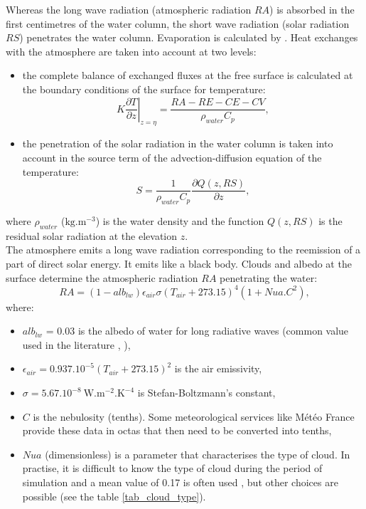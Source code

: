 Whereas the long wave radiation (atmospheric radiation $RA$) is absorbed in
the first centimetres of the water column, the short wave radiation (solar
radiation $RS$) penetrates the water column. Evaporation is calculated by .
Heat exchanges with the atmosphere are taken into account at two levels:
\begin{itemize}
\item the complete balance of exchanged fluxes at the free surface is
calculated at the boundary conditions of the surface for temperature:
\begin{equation}
K \left.  \dfrac{\partial T}{\partial z}\right|_{z=\eta} =
\dfrac{RA-RE-CE-CV}{\rho_{water}C_{p}},
\end{equation}
\item the penetration of the solar radiation in the water column is taken into
account in the source term of the advection-diffusion equation of the
temperature:
\begin{equation}
S=\dfrac{1}{\rho_{water}C_{p}}\dfrac{\partial Q(z,RS)}{\partial z},
\end{equation}
\end{itemize}
where $\rho_{water}$ ($\mathrm{{kg}.{m}^{-3}}$) is the water density and
the function $Q(z, RS)$ is the residual solar radiation at the elevation $z$.\\

The atmosphere emits a long wave radiation corresponding to the reemission of a
part of direct solar energy. It emits like a black body. Clouds and albedo at
the surface determine the atmospheric radiation $RA$ penetrating the water:
\begin{equation}
RA = (1-alb_{lw})\epsilon_{air}\sigma(T_{air}+273.15)^{4}(1+Nua . C^{2}),
\end{equation}
where:
\begin{itemize}
\item $alb_{lw}$ = 0.03 is the albedo of water for long radiative waves
(common value used in the literature \cite{imerito}, \cite{henderson-sellers}),
\item $\epsilon_{air} = 0.937.10^{-5}(T_{air}+273.15)^{2}$ is the air emissivity,
\item $\sigma= 5.67.10^{-8}~\mathrm{{W.m^{-2}.K^{-4}}}$ is Stefan-Boltzmann's constant,
\item $C$ is the nebulosity (tenths). Some meteorological services like
M\'{e}t\'{e}o France provide these data in octas that then need to be converted
into tenths,
\item $Nua$ (dimensionless) is a parameter that characterises the type of
cloud. In practise, it is difficult to know the type of cloud during the
period of simulation and a mean value of 0.17 is often used \cite{tva},
\cite{imerito} but other choices are possible (see the table \ref{tab_cloud_type}).
\end{itemize}

